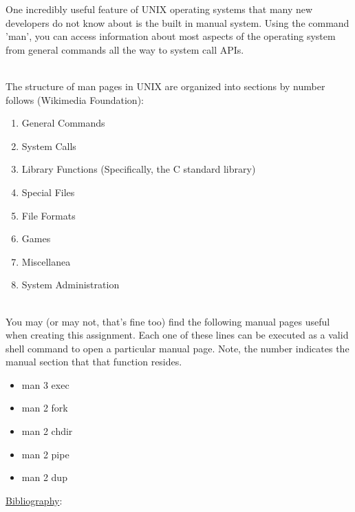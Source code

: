 \documentclass[12pt]{extarticle}
\newenvironment{myindentpar}[1]%
 {\begin{list}{}%
         {\setlength{\leftmargin}{#1}}%
         \item[]%
 }
 {\end{list}}
\begin{document}
\begin{myindentpar}{5mm}

    One incredibly useful feature of UNIX operating systems that many new developers do not know about is the built in manual system.  Using the command 'man', you can access information about most aspects of the operating system from general commands all the way to system call APIs.  
    
    \ \\
    The structure of man pages in UNIX are organized into sections by number follows (Wikimedia Foundation):
    \begin{enumerate}
        \setlength\itemsep{-0.1em}
        
        \item General Commands
        \item System Calls
        \item Library Functions (Specifically, the C standard library)
        \item Special Files
        \item File Formats
        \item Games
        \item Miscellanea
        \item System Administration
        
    \end{enumerate}
    
    \ \\
    You may (or may not, that's fine too) find the following manual pages useful when creating this assignment.  Each one of these lines can be executed as a valid shell command to open a particular manual page.  Note, the number indicates the manual section that that function resides.  
    
    \begin{itemize}
        \setlength\itemsep{-0.1em}
    
        \item man 3 exec
        \item man 2 fork
        \item man 2 chdir
        \item man 2 pipe
        \item man 2 dup
     
    \end{itemize}

\end{myindentpar}

\newpage
\noindent
{\large \underline{Bibliography}:}
\end{document}
